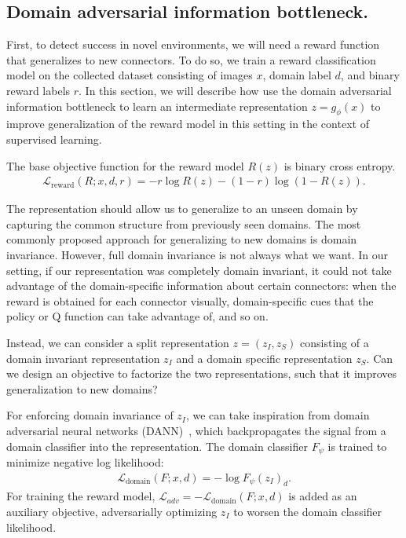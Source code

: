 \subsection{Domain adversarial information bottleneck.}
\label{sec:reward}

First, to detect success in novel environments, we will need a reward function that generalizes to new connectors. To do so, we train a reward classification model on the collected dataset consisting of images $x$, domain label $d$, and binary reward labels $r$. In this section, we will describe how use the domain adversarial information bottleneck to learn an intermediate representation $z=g_\phi(x)$ to improve generalization of the reward model in this setting in the context of supervised learning.

The base objective function for the reward model $R(z)$ is binary cross entropy. 
\begin{eqnarray}
\mathcal{L}_\text{reward}(R; x, d, r) = -r\log R(z) - (1-r)\log(1-R(z)).
\end{eqnarray}

The representation should allow us to generalize to an unseen domain by capturing the common structure from previously seen domains. The most commonly proposed approach for generalizing to new domains is domain invariance. However, full domain invariance is not always what we want. In our setting, if our representation was completely domain invariant, it could not take advantage of the domain-specific information about certain connectors: when the reward is obtained for each connector visually, domain-specific cues that the policy or Q function can take advantage of, and so on.

Instead, we can consider a split representation $z = (z_I, z_S)$ consisting of a domain invariant representation $z_I$ and a domain specific representation $z_S$. Can we design an objective to factorize the two representations, such that it improves generalization to new domains?

For enforcing domain invariance of $z_I$, we can take inspiration from domain adversarial neural networks (DANN)~\cite{ganin2016domainadversarial}, which backpropagates the signal from a domain classifier into the representation. The domain classifier $F_\psi$ is trained to minimize negative log likelihood:
\begin{eqnarray}
\mathcal{L}_\text{domain}(F; x, d) = -\log F_\psi(z_I)_d.
\end{eqnarray}
For training the reward model, $\mathcal{L}_{adv} = -\mathcal{L}_\text{domain}(F; x, d)$ is added as an auxiliary objective, adversarially optimizing $z_I$ to worsen the domain classifier likelihood.

